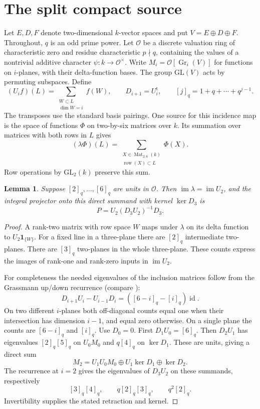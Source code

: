 \documentclass[11pt]{article}
\newtheorem{lemma}[theorem]{Lemma}
\newcommand{\Gr}{\operatorname{Gr}}
\begin{document}
\section{The split compact source}
Let $E,D,F$ denote two-dimensional $k$-vector spaces and put
$V=E\oplus D\oplus F$. Throughout, $q$ is an odd prime power.
Let $\mathcal O$ be a discrete valuation ring of characteristic
zero and residue characteristic $p\nmid q$, containing the values of a
nontrivial additive character $\psi:k\to\mathcal O^\times$.
Write $M_i=\mathcal O[\Gr_i(V)]$ for functions on $i$-planes, with
their delta-function bases. The group $\mathrm{GL}(V)$ acts by
permuting subspaces. Define
\[
 (U_i f)(L)=\sum_{\substack{W\subset L\\\dim W=i}}f(W),
 \qquad D_{i+1}=U_i^{\mathrm t},
 \qquad [j]_q=1+q+\cdots+q^{j-1}.
\]
The transposes use the standard basis pairings. One source for this
incidence map is the space of functions $\Phi$ on two-by-six matrices
over $k$. Its summation over matrices with both rows in $L$ gives
\[
 (\lambda\Phi)(L)
   =\sum_{\substack{X\in\operatorname{Mat}_{2,6}(k)\\
             \operatorname{row}(X)\subset L}}\Phi(X).
\]
Row operations by $\mathrm{GL}_2(k)$ preserve this sum.

\begin{lemma}\label{lem:project}
Suppose $[2]_q,\ldots,[6]_q$ are units in $\mathcal O$.
Then $\operatorname{im}\lambda=\operatorname{im}U_2$, and the
integral projector onto this direct summand with kernel $\ker D_3$ is
\[
             P=U_2(D_3U_2)^{-1}D_3 .
\]
\end{lemma}
\begin{proof}
A rank-two matrix with row space $W$ maps under $\lambda$ on its
delta function to $U_2\mathbf1_{\{W\}}$. For a fixed line in a
three-plane there are $[2]_q$ intermediate two-planes. There are
$[3]_q$ two-planes in the whole three-plane. These counts express
the images of rank-one and rank-zero inputs in $\operatorname{im}U_2$.

For completeness the needed eigenvalues of the inclusion matrices follow
from the Grassmann up/down recurrence (compare \cite{Srinivasan}):
\[
 D_{i+1}U_i-U_{i-1}D_i=([6-i]_q-[i]_q)\operatorname{id}.
\]
On two different $i$-planes both off-diagonal counts equal one when
their intersection has dimension $i-1$, and equal zero otherwise. On
a single plane the counts are $[6-i]_q$ and $[i]_q$. Use $D_0=0$.
First $D_1U_0=[6]_q$. Then $D_2U_1$ has eigenvalues
$[2]_q[5]_q$ on $U_0M_0$ and $q[4]_q$ on $\ker D_1$.
These are units, giving a direct sum
\[
 M_2=U_1U_0M_0\oplus U_1\ker D_1\oplus\ker D_2.
\]
The recurrence at $i=2$ gives the eigenvalues of $D_3U_2$ on these
summands, respectively
\[
 [3]_q[4]_q,\qquad q[2]_q[3]_q,\qquad q^2[2]_q .
\]
Invertibility supplies the stated retraction and kernel.
\end{proof}
\end{document}
